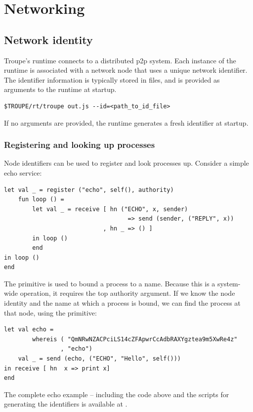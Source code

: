 \section{Networking}
\label{sec:network}

\subsection{Network identity}
Troupe's runtime connects to a distributed p2p system. 
Each instance of the runtime is associated with a network node that uses a
unique network identifier. The identifier information is typically stored in files,
and is provided as arguments to the runtime at startup.
\begin{verbatim}
$TROUPE/rt/troupe out.js --id=<path_to_id_file>    
\end{verbatim}
If no arguments are provided, the runtime generates a fresh identifier at startup.


\subsubsection{Registering and looking up processes}

Node identifiers can be used to register and look processes up.
Consider a simple echo service:
\label{example:echo}
\begin{lstlisting}
let val _ = register ("echo", self(), authority)
    fun loop () =
        let val _ = receive [ hn ("ECHO", x, sender) 
                                   => send (sender, ("REPLY", x))
                            , hn _ => () ]
        in loop ()
        end
in loop ()
end
\end{lstlisting}
The  primitive is used to bound a process to a name. Because this is a
system-wide operation, it requires the top authority argument.  If we know 
the node identity and the name at which a process is bound, we can find the process at that node, using the 
 primitive:

\begin{lstlisting}
let val echo = 
        whereis ( "QmNRwNZACPciLS14cZFApwrCcAdbRAXYgztea9m5XwRe4z"
                , "echo")
    val _ = send (echo, ("ECHO", "Hello", self()))
in receive [ hn  x => print x]
end    
\end{lstlisting}

The complete echo example -- including the code above and 
the scripts for generating the identifiers is available at 
.

